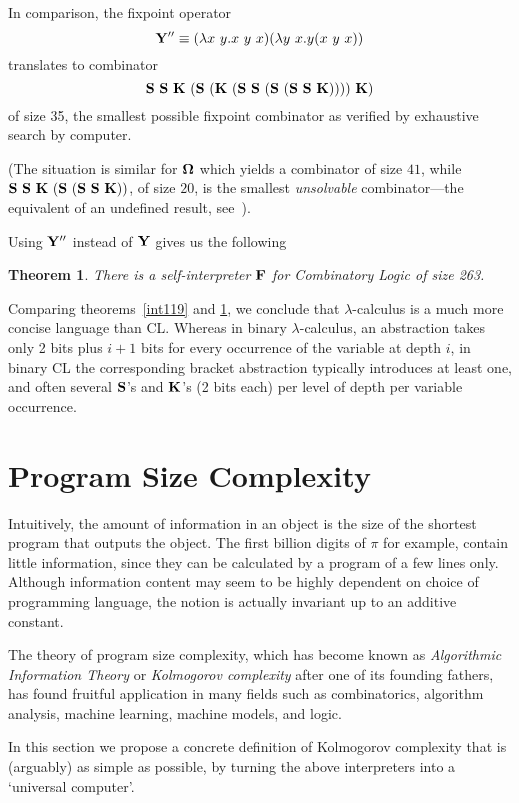 \documentclass{article}
\newtheorem{theorem}{Theorem}
\newcommand{\CS}{{\bf S}}
\newcommand{\CK}{{\bf K}}
\newcommand{\CY}{{\bf Y}}
\newcommand{\CF}{{\bf F}}
\newcommand{\COm}{{\bf \Omega}}
\begin{document}
In comparison, the fixpoint operator
\[ \CY'' \equiv (\lambda x\ y.x\ y\ x)(\lambda y\ x. y(x\ y\ x)) \]
translates to combinator \[\CS\ \CS\ \CK\ (\CS\ (\CK\ (\CS\ \CS\ (\CS\ (\CS\ \CS\ \CK))))\ \CK)\]
of size 35, the smallest possible fixpoint combinator as verified by
exhaustive search by computer.

(The situation is similar for $\COm$ which yields a combinator of size $41$,
while $\CS\ \CS\ \CK\ (\CS\ (\CS\ \CS\ \CK))$, of size $20$, is the smallest
{\em unsolvable} combinator---the equivalent of an undefined result,
see~\cite{b}).

Using $\CY''$ instead of $\CY$ gives us the following
\begin{theorem}
There is a self-interpreter $\CF$ for Combinatory Logic of size 263.
\label{int263}
\end{theorem}

Comparing theorems~\ref{int119} and \ref{int263}, we conclude that
$\lambda$-calculus is a much more concise language than CL. Whereas
in binary $\lambda$-calculus, an abstraction takes only 2 bits plus
$i+1$ bits for every occurrence of the variable at depth $i$, in binary
CL the corresponding bracket abstraction typically introduces at least one,
and often several $\CS$'s and $\CK$'s (2 bits each)
per level of depth per variable occurrence.

\section{Program Size Complexity}

Intuitively, the amount of information in an object
is the size of the shortest program that outputs the object.
The first billion digits of $\pi$ for example, contain little information,
since they can be calculated by a program of a few lines only.
Although information content may seem to be highly dependent on
choice of programming language,
the notion is actually invariant up to an additive constant.

The theory of program size complexity, which has become known as
{\em Algorithmic Information Theory} or {\em Kolmogorov complexity}
after one of its founding fathers,
has found fruitful application in many fields such as combinatorics,
algorithm analysis, machine learning, machine models, and logic.

In this section we propose a concrete definition of Kolmogorov complexity
that is (arguably) as simple as possible, by turning the above interpreters
into a `universal computer'.
\end{document}
